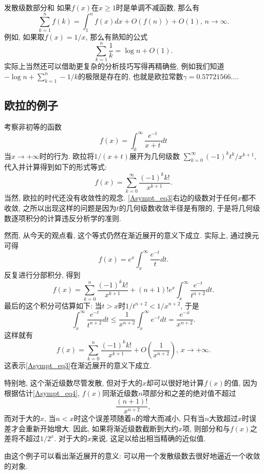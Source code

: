 \begin{example}{发散级数部分和}
如果$f(x)$在$x\geq1$时是单调不减函数, 那么有$$
\sum_{k=1}^nf(k)=\int_1^n f(x)dx+O(f(n))+O(1),\,n\to\infty.
$$
例如, 如果取$f(x)=1/x$, 那么有熟知的公式
$$
\sum_{k=1}^n\frac{1}{k}=\log n+O(1).
$$
实际上当然还可以借助更复杂的分析技巧写得再精确些, 例如我们知道$-\log n+\sum_{k=1}^n-1/k$的极限是存在的, 也就是欧拉常数$\gamma=0.57721566...$.
\end{example}

\subsection{欧拉的例子}
考察非初等的函数
$$
f(x)=\int_0^\infty\frac{e^{-t}}{x+t}dt
$$
当$x\to+\infty$时的行为. 欧拉将$1/(x+t)$展开为几何级数
$
\sum_{k=0}^\infty {(-1)^kt^k}/{x^{k+1}},
$
代入并计算得到如下的形式等式:
\begin{equation}\label{Asympt_eq3}
f(x)=\sum_{k=0}^\infty\frac{(-1)^kk!}{x^{k+1}}.
\end{equation}
当然, 欧拉的时代还没有收敛性的观念. \autoref{Asympt_eq3}右边的级数对于任何$x$都不收敛, 之所以出现这样的问题是因为$t$的几何级数收敛半径是有限的, 于是将几何级数逐项积分的计算违反分析学的准则. 

然而, 从今天的观点看, 这个等式仍然在渐近展开的意义下成立. 实际上, 通过换元可得
$$
f(x)=e^{x}\int_x^\infty \frac{e^{-t}}{t}dt.
$$
反复进行分部积分, 得到
$$
f(x)=\sum_{k=0}^n\frac{(-1)^kk!}{x^{k+1}}
+(n+1)!e^x\int_x^\infty\frac{e^{-t}}{t^{n+2}}dt.
$$
最后的这个积分可估算如下: 当$t>x$时$1/t^{n+2}<1/x^{n+2}$, 于是
\begin{equation}\label{Asympt_eq4}
\int_x^\infty\frac{e^{-t}}{t^{n+2}}dt
\leq\frac{1}{x^{n+2}}\int_x^\infty e^{-t}dt
=\frac{e^{-x}}{x^{n+2}}.
\end{equation}
这样就有
$$
f(x)=\sum_{k=0}^n\frac{(-1)^kk!}{x^{k+1}}
+O\left(\frac{1}{x^{n+2}}\right),\,x\to+\infty.
$$
这表示\autoref{Asympt_eq3}在渐近展开的意义下成立. 

特别地, 这个渐近级数尽管发散, 但对于大的$x$却可以很好地计算$f(x)$的值, 因为根据估计\autoref{Asympt_eq4}, $f(x)$同渐近级数$n$项部分和之差的绝对值不超过
$$
\frac{(n+1)!}{x^{n+2}},
$$
而对于大的$x$, 当$n<x$时这个误差项随着$n$的增大而减小, 只有当$n$大致超过$x$时误差才会重新开始增大. 因此, 如果将渐近级数截断到大约$x$项, 则部分和与$f(x)$之差将不超过$1/2^x$. 对于大的$x$来说, 这足以给出相当精确的近似值. 

由这个例子可以看出渐近展开的意义: 可以用一个发散级数去很好地逼近一个收敛的对象.